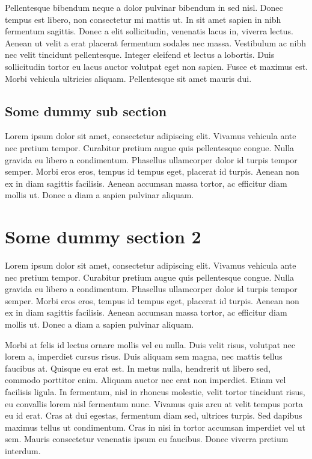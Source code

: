 Pellentesque bibendum neque a dolor pulvinar bibendum in sed nisl. Donec tempus est libero, non consectetur mi mattis ut. In sit amet sapien in nibh fermentum sagittis. Donec a elit sollicitudin, venenatis lacus in, viverra lectus. Aenean ut velit a erat placerat fermentum sodales nec massa. Vestibulum ac nibh nec velit tincidunt pellentesque. Integer eleifend et lectus a lobortis. Duis sollicitudin tortor eu lacus auctor volutpat eget non sapien. Fusce et maximus est. Morbi vehicula ultricies aliquam. Pellentesque sit amet mauris dui.

\subsection{Some dummy sub section}

Lorem ipsum dolor sit amet, consectetur adipiscing elit. Vivamus vehicula ante nec pretium tempor. Curabitur pretium augue quis pellentesque congue. Nulla gravida eu libero a condimentum. Phasellus ullamcorper dolor id turpis tempor semper. Morbi eros eros, tempus id tempus eget, placerat id turpis. Aenean non ex in diam sagittis facilisis. Aenean accumsan massa tortor, ac efficitur diam mollis ut. Donec a diam a sapien pulvinar aliquam.

\section{Some dummy section 2}

Lorem ipsum dolor sit amet, consectetur adipiscing elit. Vivamus vehicula ante nec pretium tempor. Curabitur pretium augue quis pellentesque congue. Nulla gravida eu libero a condimentum. Phasellus ullamcorper dolor id turpis tempor semper. Morbi eros eros, tempus id tempus eget, placerat id turpis. Aenean non ex in diam sagittis facilisis. Aenean accumsan massa tortor, ac efficitur diam mollis ut. Donec a diam a sapien pulvinar aliquam.

Morbi at felis id lectus ornare mollis vel eu nulla. Duis velit risus, volutpat nec lorem a, imperdiet cursus risus. Duis aliquam sem magna, nec mattis tellus faucibus at. Quisque eu erat est. In metus nulla, hendrerit ut libero sed, commodo porttitor enim. Aliquam auctor nec erat non imperdiet. Etiam vel facilisis ligula. In fermentum, nisl in rhoncus molestie, velit tortor tincidunt risus, eu convallis lorem nisl fermentum nunc. Vivamus quis arcu at velit tempus porta eu id erat. Cras at dui egestas, fermentum diam sed, ultrices turpis. Sed dapibus maximus tellus ut condimentum. Cras in nisi in tortor accumsan imperdiet vel ut sem. Mauris consectetur venenatis ipsum eu faucibus. Donec viverra pretium interdum.

